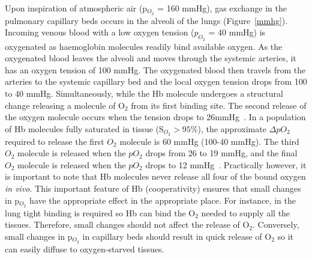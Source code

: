 Upon inspiration of atmospheric air (p$_{O_2}$ = 160 mmHg), gas exchange in the pulmonary capillary beds occurs in the alveoli of the lungs (Figure~\ref{mmhg}).
Incoming venous blood with a low oxygen tension ($p_{O_2}$ = 40 mmHg) is oxygenated as haemoglobin molecules readily bind available oxygen. 
As the oxygenated blood leaves the alveoli and moves through the systemic arteries, it has an oxygen tension of 100 mmHg. 
The oxygenated blood then travels from the arteries to the systemic capillary bed and the local oxygen tension drops from 100 to 40 mmHg.
Simultaneously, while the \acs{Hb} molecule undergoes a structural change releasing a molecule of O$_2$ from its first binding site.  
The second release of the oxygen molecule occurs when the tension drops to 26mmHg~\cite{GomezCambronero:2001hu}.
In a population of \acs{Hb} molecules fully saturated in tissue (S$_{O_2}>95\%$), the approximate $\Delta pO_2$ required to release the first ${O_2}$ molecule is 60 mmHg (100-40 mmHg).
The third ${O_2}$ molecule is released when the $pO_2$ drops from 26 to 19 mmHg, and the final ${O_2}$ molecule is released when the $pO_2$ drops to 12 mmHg~\cite{GomezCambronero:2001hu}.
Practically however, it is important to note that \acs{Hb} molecules never release all four of the bound oxygen \emph{in vivo}.
This important feature of \acs{Hb} (cooperativity) ensures that small changes in p$_{O_2}$ have the appropriate effect in the appropriate place. 
For instance, in the lung tight binding is required so \acs{Hb} can bind the O$_2$ needed to supply all the tissues.
Therefore, small changes should not affect the release of O$_2$.
Conversely, small changes in p$_{O_2}$ in capillary beds should result in quick release of O$_2$ so it can easily diffuse to oxygen-starved tissues. 

